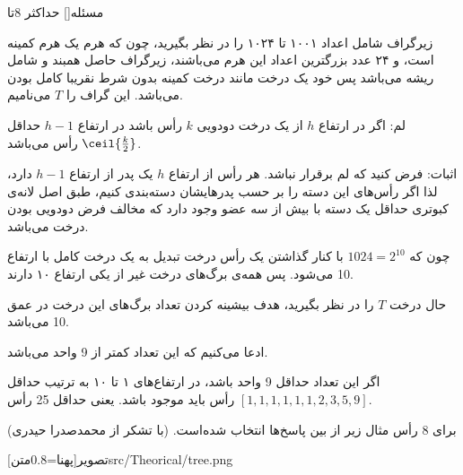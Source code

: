 
‌مسئله[]
حداکثر 8تا

زیرگراف شامل اعداد ۱۰۰۱ تا ۱۰۲۴ را در نظر بگیرید، چون که هرم یک هرم کمینه است، و ۲۴ عدد بزرگترین اعداد این هرم می‌باشند، زیرگراف حاصل همبند و شامل ریشه می‌باشد پس خود یک درخت مانند درخت کمینه بدون شرط نقریبا کامل بودن می‌باشد. این گراف را $T$ می‌نامیم.

لم: اگر در ارتفاع $h$ از یک درخت دودویی $k$ رأس باشد در ارتفاع $h-1$ حداقل
$\ceil{\frac{k}{2}}$
رأس می‌باشد.

اثبات: فرض کنید که لم برقرار نباشد. هر رأس  از ارتفاع $h$ یک پدر از ارتفاع $h-1$ دارد، لذا اگر رأس‌های این دسته را بر حسب پدر‌هایشان دسته‌بندی کنیم، طبق اصل لانه‌ی کبوتری حداقل یک دسته با بیش از سه عضو وجود دارد که مخالف فرض دودویی بودن درخت می‌باشد.

چون که
$1024 = 2^{10}$
با کنار گذاشتن یک رأس درخت تبدیل به یک درخت کامل با ارتفاع 10 می‌شود. پس همه‌ی برگ‌های درخت غیر از یکی ارتفاع ۱۰ دارند.

حال درخت $T$ را در نظر بگیرید، هدف بیشینه کردن تعداد برگ‌های این درخت در عمق 10 می‌باشد.

ادعا می‌کنیم که این تعداد کمتر‌ از 9 واحد می‌باشد.
 
 اگر این تعداد حداقل 9 واحد باشد، در ارتفاع‌های ۱ تا ۱۰ به ترتیب حداقل
$[1, 1, 1, 1, 1, 1, 2, 3, 5, 9]$
رأس باید موجود باشد. یعنی حداقل 25 رأس.

برای 8 رأس مثال زیر از بین پاسخ‌ها انتخاب شده‌است. (با تشکر از محمدصدرا حیدری)

\begin{center}
‌تصویر[پهنا=0.8‌متن]{src/Theorical/tree.png}
\end{center}









